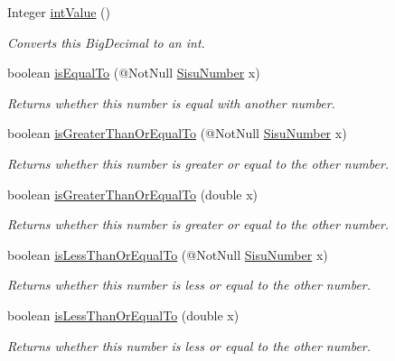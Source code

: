 \begin{DoxyCompactItemize}
Integer \hyperlink{classcom_1_1aarrelaakso_1_1drawl_1_1_sisu_number_aa47667c48867cb223722df6facb0da42}{int\+Value} ()
\begin{DoxyCompactList}\small\item\em Converts this Big\+Decimal to an int. \end{DoxyCompactList}\item 
boolean \hyperlink{classcom_1_1aarrelaakso_1_1drawl_1_1_sisu_number_a68e44e751c7dcd27d184576da9d4fb2e}{is\+Equal\+To} (@Not\+Null \hyperlink{classcom_1_1aarrelaakso_1_1drawl_1_1_sisu_number}{Sisu\+Number} x)
\begin{DoxyCompactList}\small\item\em Returns whether this number is equal with another number. \end{DoxyCompactList}\item 
boolean \hyperlink{classcom_1_1aarrelaakso_1_1drawl_1_1_sisu_number_ae29e0df03c9bc4bca10b3bd0df540fd7}{is\+Greater\+Than\+Or\+Equal\+To} (@Not\+Null \hyperlink{classcom_1_1aarrelaakso_1_1drawl_1_1_sisu_number}{Sisu\+Number} x)
\begin{DoxyCompactList}\small\item\em Returns whether this number is greater or equal to the other number. \end{DoxyCompactList}\item 
boolean \hyperlink{classcom_1_1aarrelaakso_1_1drawl_1_1_sisu_number_ae99967be90c7a0a7c0233556f7df30ef}{is\+Greater\+Than\+Or\+Equal\+To} (double x)
\begin{DoxyCompactList}\small\item\em Returns whether this number is greater or equal to the other number. \end{DoxyCompactList}\item 
boolean \hyperlink{classcom_1_1aarrelaakso_1_1drawl_1_1_sisu_number_a4dfb5aa3e2f14925c528d21113744b17}{is\+Less\+Than\+Or\+Equal\+To} (@Not\+Null \hyperlink{classcom_1_1aarrelaakso_1_1drawl_1_1_sisu_number}{Sisu\+Number} x)
\begin{DoxyCompactList}\small\item\em Returns whether this number is less or equal to the other number. \end{DoxyCompactList}\item 
boolean \hyperlink{classcom_1_1aarrelaakso_1_1drawl_1_1_sisu_number_ad1ea9f6dcbf997db828ee02b7c0aef94}{is\+Less\+Than\+Or\+Equal\+To} (double x)
\begin{DoxyCompactList}\small\item\em Returns whether this number is less or equal to the other number. \end{DoxyCompactList}\item 

\end{DoxyCompactItemize}

